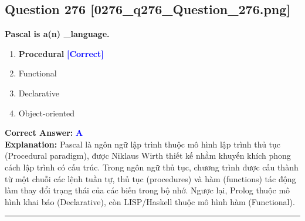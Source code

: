 \documentclass[11pt,a4paper]{article}
\begin{document}
\begin{minipage}{\textwidth}
\subsection*{Question 276 \quad \footnotesize{[0276\_q276\_Question\_276.png]}}
\noindent \textbf{Pascal is a(n) \_language.}

\begin{enumerate}[label=\Alph*.]
    \item \textbf{Procedural} \hfill \textcolor{blue}{\textbf{[Correct]}}
    \item Functional
    \item Declarative
    \item Object-oriented
\end{enumerate}

\noindent \textbf{Correct Answer:} \textcolor{blue}{\textbf{A}} \\[2pt]
\noindent \textbf{Explanation:} Pascal là ngôn ngữ lập trình thuộc mô hình lập trình thủ tục (Procedural paradigm), được Niklaus Wirth thiết kế nhằm khuyến khích phong cách lập trình có cấu trúc. Trong ngôn ngữ thủ tục, chương trình được cấu thành từ một chuỗi các lệnh tuần tự, thủ tục (procedures) và hàm (functions) tác động làm thay đổi trạng thái của các biến trong bộ nhớ. Ngược lại, Prolog thuộc mô hình khai báo (Declarative), còn LISP/Haskell thuộc mô hình hàm (Functional).

\par\vspace{0.3cm}
\hrule
\vspace{0.3cm}
\end{minipage}
\end{document}
